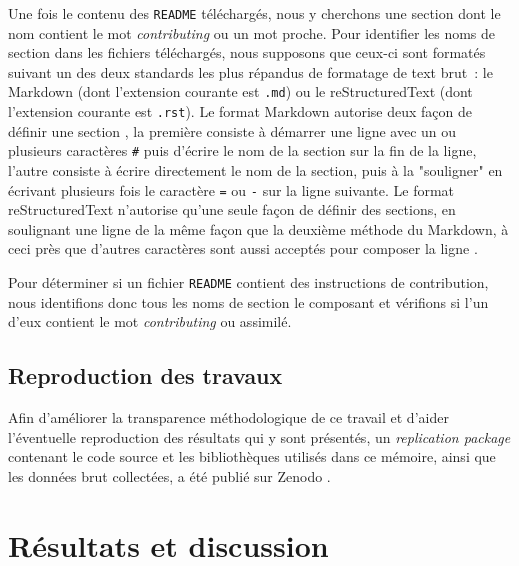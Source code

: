 \documentclass[dvipsnames,runningheads]{llncs}
\newcommand{\en}[1]{\foreignlanguage{english}{\emph{#1}}}
\begin{document}
    Une fois le contenu des \texttt{README} téléchargés, nous y cherchons une section dont le nom contient le
    mot \en{contributing} ou un mot proche. Pour identifier les noms de section dans les fichiers téléchargés,
    nous supposons que ceux-ci sont formatés suivant un des deux standards les plus répandus de formatage de
    text brut : le Markdown (dont l'extension courante est \texttt{.md}) ou le reStructuredText (dont
    l'extension courante est \texttt{.rst}). Le format Markdown autorise deux façon de définir une section
    \parencite{markdown-headings}, la première consiste à démarrer une ligne avec un ou plusieurs caractères
    \texttt{\#} puis d'écrire le nom de la section sur la fin de la ligne, l'autre consiste à écrire
    directement le nom de la section, puis à la "souligner" en écrivant plusieurs fois le caractère \texttt{=}
    ou \texttt{-} sur la ligne suivante. Le format reStructuredText n'autorise qu'une seule façon de définir
    des sections, en soulignant une ligne de la même façon que la deuxième méthode du Markdown, à ceci près
    que d'autres caractères sont aussi acceptés pour composer la ligne \parencite{rst-sections}.

    Pour déterminer si un fichier \texttt{README} contient des instructions de contribution, nous identifions
    donc tous les noms de section le composant et vérifions si l'un d'eux contient le mot \en{contributing} ou
    assimilé.

    \subsection{Reproduction des travaux}

    Afin d'améliorer la transparence méthodologique de ce travail et d'aider l'éventuelle reproduction des
    résultats qui y sont présentés, un \en{replication package} contenant le code source et les bibliothèques
    utilisés dans ce mémoire, ainsi que les données brut collectées, a été publié sur Zenodo
    \parencite{replication-package}.

    \section{Résultats et discussion}

    \captionsetup[figure]{format=plain,singlelinecheck=true,justification=centering}
    \captionsetup[subfigure]{format=plain,singlelinecheck=true,justification=centering}
    \captionsetup[table]{format=plain,singlelinecheck=true,justification=centering,position=above}
\end{document}

